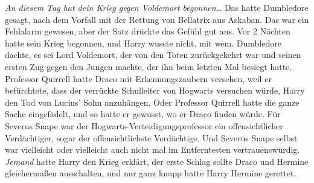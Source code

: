 \emph{An diesem Tag hat dein Krieg gegen Voldemort begonnen…}
Das hatte Dumbledore gesagt, nach dem Vorfall mit der Rettung von Bellatrix aus Askaban. Das war ein Fehlalarm gewesen, aber der Satz drückte das Gefühl gut aus.
Vor 2 Nächten hatte sein Krieg begonnen, und Harry wusste nicht, mit wem.
Dumbledore dachte, es sei Lord Voldemort, der von den Toten zurückgekehrt war und seinen ersten Zug gegen den Jungen machte, der ihn beim letzten Mal besiegt hatte.
Professor Quirrell hatte Draco mit Erkennungszaubern versehen, weil er befürchtete, dass der verrückte Schulleiter von Hogwarts versuchen würde, Harry den Tod von Lucius' Sohn anzuhängen.
Oder Professor Quirrell hatte die ganze Sache eingefädelt, und so hatte er gewusst, wo er Draco finden würde. Für Severus Snape war der Hogwarts-Verteidigungsprofessor ein offensichtlicher Verdächtiger, sogar der offensichtlichste Verdächtige.
Und Severus Snape selbst war vielleicht oder vielleicht auch nicht mal im Entferntesten vertrauenswürdig.
\emph{Jemand} hatte Harry den Krieg erklärt, der erste Schlag sollte Draco und Hermine gleichermaßen ausschalten, und nur ganz knapp hatte Harry Hermine gerettet.
